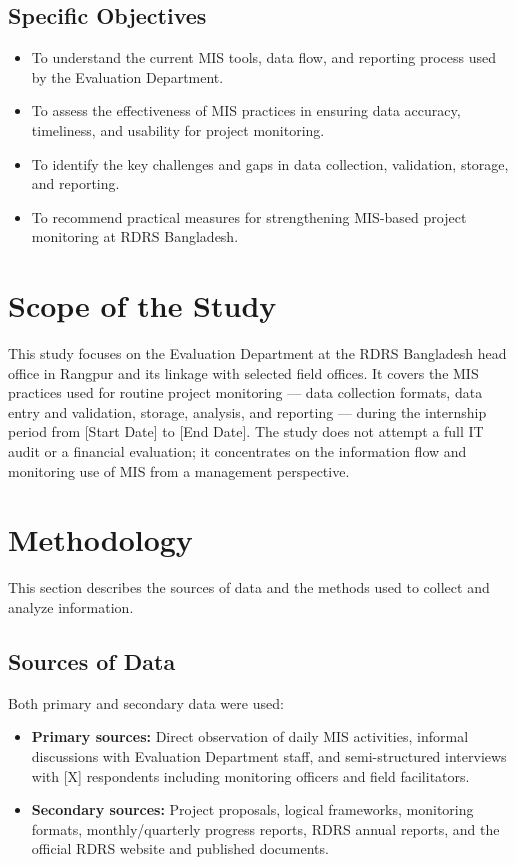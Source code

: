 \documentclass[12pt,a4paper]{report}
\begin{document}
\subsection{Specific Objectives}
\begin{itemize}
    \item To understand the current MIS tools, data flow, and reporting
        process used by the Evaluation Department.
    \item To assess the effectiveness of MIS practices in ensuring data
        accuracy, timeliness, and usability for project monitoring.
    \item To identify the key challenges and gaps in data collection,
        validation, storage, and reporting.
    \item To recommend practical measures for strengthening MIS-based
        project monitoring at RDRS Bangladesh.
\end{itemize}

\section{Scope of the Study}
This study focuses on the Evaluation Department at the RDRS Bangladesh
head office in Rangpur and its linkage with selected field offices. It
covers the MIS practices used for routine project monitoring --- data
collection formats, data entry and validation, storage, analysis, and
reporting --- during the internship period from [Start Date] to
[End Date]. The study does not attempt a full IT audit or a financial
evaluation; it concentrates on the information flow and monitoring use
of MIS from a management perspective.

\section{Methodology}
This section describes the sources of data and the methods used to
collect and analyze information.

\subsection{Sources of Data}
Both primary and secondary data were used:
\begin{itemize}
    \item \textbf{Primary sources:} Direct observation of daily MIS
        activities, informal discussions with Evaluation Department
        staff, and semi-structured interviews with [X] respondents
        including monitoring officers and field facilitators.
    \item \textbf{Secondary sources:} Project proposals, logical
        frameworks, monitoring formats, monthly/quarterly progress
        reports, RDRS annual reports, and the official RDRS website
        and published documents.
\end{itemize}
\end{document}
